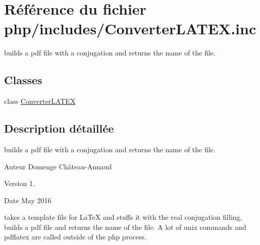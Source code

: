 \hypertarget{ConverterLATEX_8inc}{}\section{Référence du fichier php/includes/\+Converter\+L\+A\+T\+EX.inc}
\label{ConverterLATEX_8inc}


builds a pdf file with a conjugation and returns the name of the file.  


\subsection*{Classes}
\begin{DoxyCompactItemize}
\item 
class \hyperlink{classConverterLATEX}{Converter\+L\+A\+T\+EX}
\end{DoxyCompactItemize}


\subsection{Description détaillée}
builds a pdf file with a conjugation and returns the name of the file. 

\begin{DoxyAuthor}{Auteur}
Domenge Château-\/\+Annaud 
\end{DoxyAuthor}
\begin{DoxyVersion}{Version}
1. 
\end{DoxyVersion}
\begin{DoxyDate}{Date}
May 2016
\end{DoxyDate}
takes a template file for La\+TeX and stuffs it with the real conjugation filling, builds a pdf file and returns the name of the file. A lot of unix commands and pdflatex are called outside of the php process. 